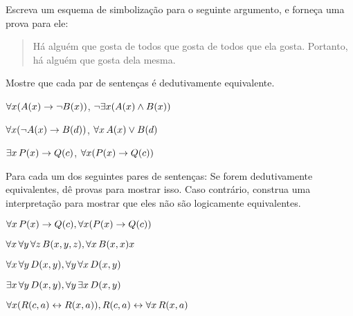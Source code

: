 \solutions
\problempart
\label{pr.likes}
Escreva um esquema de simboliza\c c\~ao para o seguinte argumento, e forne\c ca uma prova para ele:
\begin{quote}
H\'a algu\'em que gosta de todos que gosta de todos que ela gosta. Portanto, h\'a algu\'em que gosta dela mesma.
\end{quote}


\problempart
Mostre que cada par de senten\c cas \'e dedutivamente equivalente.
\begin{earg}
\item $\forall x (\mathord{A}(x)\rightarrow \neg \mathord{B}(x))$, $\neg\exists x(\mathord{A}(x) \wedge \mathord{B}(x))$
\item $\forall x (\neg\mathord{A}(x)\rightarrow \mathord{B}(d))$, $\forall x\,\mathord{A}(x) \vee \mathord{B}(d)$
\item $\exists x\,\mathord{P}(x) \rightarrow \mathord{Q}(c)$, $\forall x (\mathord{P}(x) \rightarrow \mathord{Q}(c))$
\end{earg}

\solutions
\problempart
\label{pr.FOLequivornot}
Para cada um dos seguintes pares de senten\c cas: Se forem dedutivamente equivalentes, d\^e provas para mostrar isso. Caso contr\'ario, construa uma interpreta\c c\~ao para mostrar que eles n\~ao s\~ao logicamente equivalentes.
\begin{earg}
\item $\forall x\,\mathord{P}(x) \rightarrow \mathord{Q}(c), \forall x (\mathord{P}(x) \rightarrow \mathord{Q}(c))$
\item $\forall x\,\forall y\, \forall z\,\mathord{B}(x,y,z), \forall x\,\mathord{B}(x,x)x$
\item $\forall x\,\forall y\,\mathord{D}(x,y), \forall y\,\forall x\,\mathord{D}(x,y)$
\item $\exists x\,\forall y\,\mathord{D}(x,y), \forall y\,\exists x\,\mathord{D}(x,y)$
\item $\forall x (\mathord{R}(c,a) \leftrightarrow \mathord{R}(x,a)), \mathord{R}(c,a) \leftrightarrow \forall x\,\mathord{R}(x,a)$
\end{earg}

